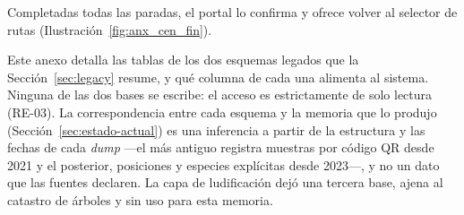 
Completadas todas las paradas, el portal lo confirma y ofrece volver al selector de rutas
(Ilustración~\ref{fig:anx_cen_fin}).


\label{anx:modelo-legado}

Este anexo detalla las tablas de los dos esquemas legados que la Sección~\ref{sec:legacy} resume, y
qué columna de cada una alimenta al sistema. Ninguna de las dos bases se escribe: el acceso es
estrictamente de solo lectura (RE-03). La correspondencia entre cada esquema y la memoria que lo
produjo (Sección~\ref{sec:estado-actual}) es una inferencia a partir de la estructura y las fechas
de cada \textit{dump} ---el más antiguo registra muestras por código QR desde 2021 y el posterior,
posiciones y especies explícitas desde 2023---, y no un dato que las fuentes declaren. La capa de
ludificación \citep{binder-cortes2023} dejó una tercera base, ajena al catastro de árboles y sin
uso para esta memoria.

